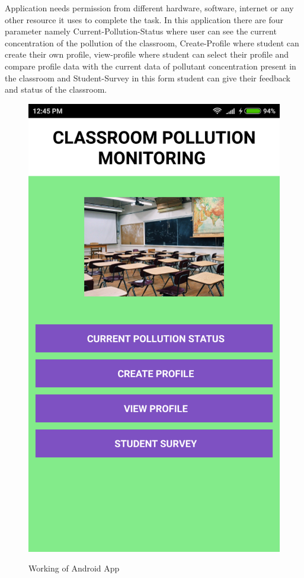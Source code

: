 Application needs permission from different hardware, software, internet or any other resource it uses to complete the task. In this application there are four parameter namely Current-Pollution-Status where user can see the current concentration of the pollution of the classroom, Create-Profile where student can create their own profile, view-profile where student can select their profile and compare profile data with the current data of pollutant concentration present in the classroom and Student-Survey in this form student can give their feedback and status of the classroom.
\begin{figure}[!htbp]
	\centering
	\includegraphics[scale=0.09]{image2.png}
	\label{fig:Working of Android App}
	\caption{Working of Android App}
\end{figure}

